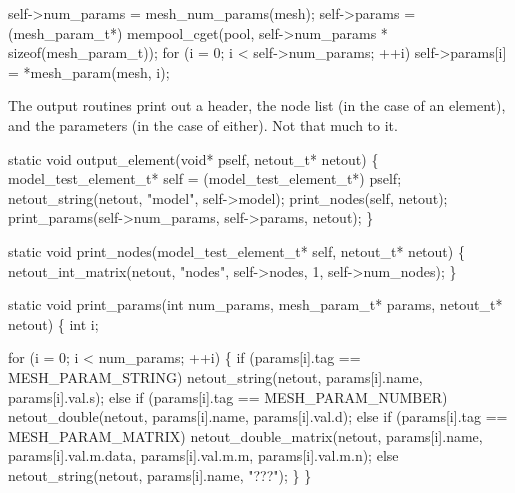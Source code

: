 \nwenddocs{}\endmoddef
self->num_params = mesh_num_params(mesh);
self->params = (mesh_param_t*)
    mempool_cget(pool, self->num_params * sizeof(mesh_param_t));
for (i = 0; i < self->num_params; ++i)
    self->params[i] = *mesh_param(mesh, i);
\nwendcode{}\nwdocspar

The output routines print out a header, the node list (in the case
of an element), and the parameters (in the case of either).  Not
that much to it.

\nwenddocs{}\plusendmoddef
static void output_element(void* pself, netout_t* netout)
\{
    model_test_element_t* self = (model_test_element_t*) pself;
    netout_string(netout, "model", self->model);
    print_nodes(self, netout);
    print_params(self->num_params, self->params, netout);
\}

\nwendcode{}\nwdocspar

\nwenddocs{}\endmoddef
static void print_nodes(model_test_element_t* self, netout_t* netout)
\{
    netout_int_matrix(netout, "nodes", self->nodes, 1, self->num_nodes);
\}

\nwendcode{}\nwdocspar

\nwenddocs{}\plusendmoddef
static void print_params(int num_params, mesh_param_t* params, 
                         netout_t* netout)
\{
    int i;

    for (i = 0; i < num_params; ++i) \{
        if (params[i].tag == MESH_PARAM_STRING)
            netout_string(netout, params[i].name, params[i].val.s);
        else if (params[i].tag == MESH_PARAM_NUMBER)
            netout_double(netout, params[i].name, params[i].val.d);
        else if (params[i].tag == MESH_PARAM_MATRIX)
            netout_double_matrix(netout, params[i].name,
                                 params[i].val.m.data,
                                 params[i].val.m.m,
                                 params[i].val.m.n);
        else
            netout_string(netout, params[i].name, "???");
    \}
\}

